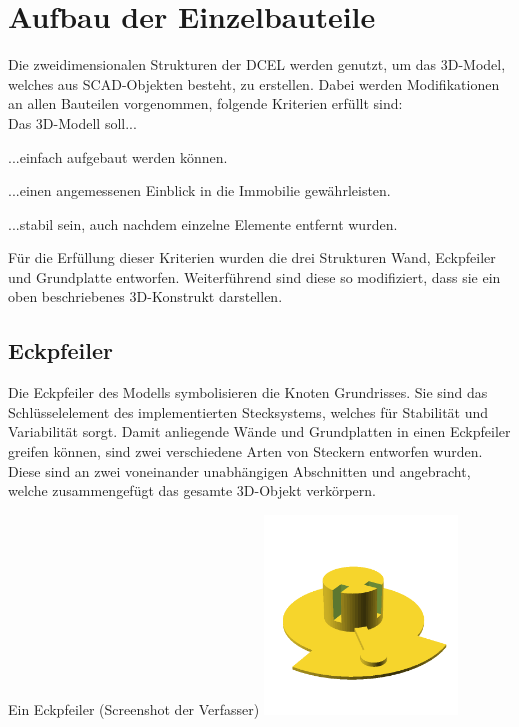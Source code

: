 \section{Aufbau der Einzelbauteile}
Die zweidimensionalen Strukturen der DCEL werden genutzt, um das 3D-Model, welches aus SCAD-Objekten besteht, zu erstellen.
Dabei werden Modifikationen an allen Bauteilen vorgenommen, folgende Kriterien erfüllt sind:\\
Das 3D-Modell soll...
\begin{compactenum}
	\item ...einfach aufgebaut werden können.
	\item ...einen angemessenen Einblick in die Immobilie gewährleisten.
	\item ...stabil sein, auch nachdem einzelne Elemente entfernt wurden.
\end{compactenum}
Für die Erfüllung dieser Kriterien wurden die drei Strukturen Wand, Eckpfeiler und Grundplatte entworfen.
Weiterführend sind diese so modifiziert, dass sie ein oben beschriebenes 3D-Konstrukt darstellen.

\subsection{Eckpfeiler}
Die Eckpfeiler des Modells symbolisieren die Knoten Grundrisses.
Sie sind das Schlüsselelement des implementierten Stecksystems, welches für Stabilität und Variabilität sorgt.
Damit anliegende Wände und Grundplatten in einen Eckpfeiler greifen können, sind zwei verschiedene Arten von Steckern entworfen wurden.
Diese sind an zwei voneinander unabhängigen Abschnitten  und  angebracht, welche zusammengefügt das gesamte 3D-Objekt verkörpern.
\begin{Bild}{Ein Eckpfeiler (Screenshot der Verfasser)}
	\includegraphics[height=200px]{Bilder/Untereinheit_Ecke}
\end{Bild}
